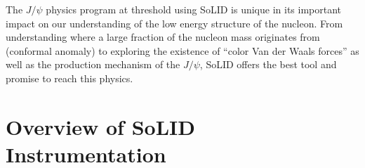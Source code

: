 \documentclass[12pt]{article}
\begin{document}

The $J/\psi$ physics program at threshold using SoLID is unique in its important impact on our understanding of the low energy structure of the nucleon. From understanding where a large fraction of the nucleon mass originates from (conformal anomaly) to exploring the existence of ``color Van der Waals forces'' as well as the production mechanism of the $J/\psi$, SoLID offers the best tool and promise to reach this physics. 

\section{Overview of SoLID Instrumentation}
\end{document}
